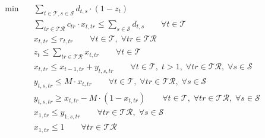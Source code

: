 \begin{align}
  \min\quad & \sum_{t \in \mathcal{T}, s \in \mathcal{S}} d_{t,s} \cdot (1 - z_{t}) \tag{resilience} \\
  & \sum_{tr \in \mathcal{TR}} c_{tr} \cdot x_{t,tr} \le \sum_{s \in \mathcal{S}} d_{t,s} \qquad \forall t \in \mathcal{T} \tag{train\_capacity} \\
  & x_{t,tr} \le r_{t,tr} \qquad \forall t \in \mathcal{T},\; \forall tr \in \mathcal{TR} \tag{train\_recovery} \\
  & z_{t} \le \sum_{tr \in \mathcal{TR}} x_{t,tr} \qquad \forall t \in \mathcal{T} \tag{station\_recovery} \\
  & x_{t,tr} \le x_{t-1,tr} + y_{t,s,tr} \qquad \forall t \in \mathcal{T},\; t > 1,\; \forall tr \in \mathcal{TR},\; \forall s \in \mathcal{S} \tag{timetable\_rescheduling} \\
  & y_{t,s,tr} \le M \cdot x_{t,tr} \qquad \forall t \in \mathcal{T},\; \forall tr \in \mathcal{TR},\; \forall s \in \mathcal{S} \tag{timetable\_rescheduling} \\
  & y_{t,s,tr} \ge x_{t,tr} - M \cdot (1 - x_{t,tr}) \qquad \forall t \in \mathcal{T},\; \forall tr \in \mathcal{TR},\; \forall s \in \mathcal{S} \tag{timetable\_rescheduling} \\
  & x_{1,tr} \le y_{1,s,tr} \qquad \forall tr \in \mathcal{TR},\; \forall s \in \mathcal{S} \tag{initial\_condition} \\
  & x_{1,tr} \le 1 \qquad \forall tr \in \mathcal{TR} \tag{initial\_condition} \\
\end{align}